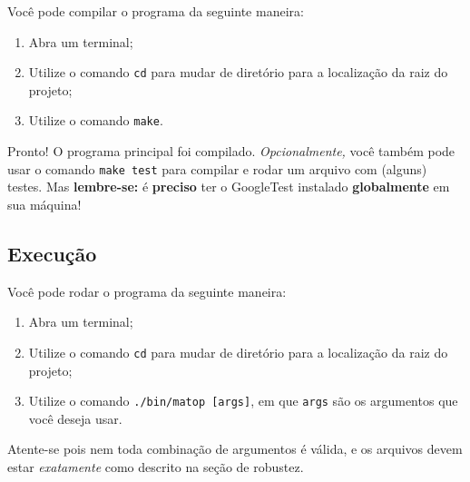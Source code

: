 \documentclass{article}
\def\code#1{\texttt{#1}}
\begin{document}
Você pode compilar o programa da seguinte maneira:

\begin{enumerate}
    \item Abra um terminal;
    \item Utilize o comando \code{cd} para mudar de diretório para a localização da raiz do projeto;
    \item Utilize o comando \code{make}. 
\end{enumerate}

Pronto! O programa principal foi compilado. \textit{Opcionalmente,} você também pode usar o comando \code{make test} para compilar e rodar um arquivo com (alguns) testes. Mas \textbf{lembre-se:} é \textbf{preciso} ter o GoogleTest instalado \textbf{globalmente} em sua máquina!

\subsection*{Execução}

Você pode rodar o programa da seguinte maneira:

\begin{enumerate}
    \item Abra um terminal;
    \item Utilize o comando \code{cd} para mudar de diretório para a localização da raiz do projeto;
    \item Utilize o comando \code{./bin/matop [args]}, em que \code{args} são os argumentos que você deseja usar. 
\end{enumerate}

Atente-se pois nem toda combinação de argumentos é válida, e os arquivos devem estar \textit{exatamente} como descrito na seção de robustez.
\end{document}
